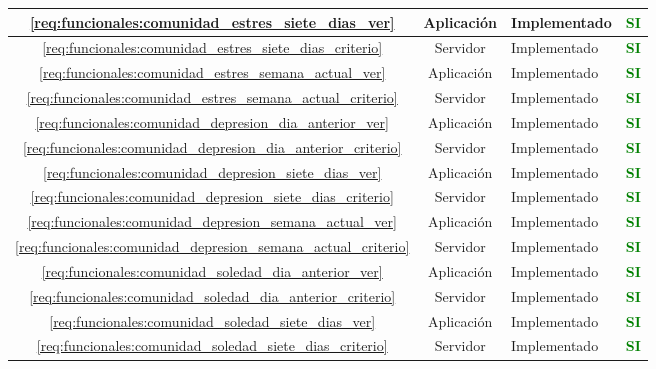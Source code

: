 \begin{xltabular}{\textwidth}{|c|c|X|c|}
        \hline
        \ref{req:funcionales:comunidad_estres_siete_dias_ver} & Aplicación & Implementado & \textcolor{green}{\textbf{SI}} \\
        \hline
        \ref{req:funcionales:comunidad_estres_siete_dias_criterio} & Servidor & Implementado & \textcolor{green}{\textbf{SI}} \\
        \hline
        \ref{req:funcionales:comunidad_estres_semana_actual_ver} & Aplicación & Implementado & \textcolor{green}{\textbf{SI}} \\
        \hline
        \ref{req:funcionales:comunidad_estres_semana_actual_criterio} & Servidor & Implementado & \textcolor{green}{\textbf{SI}} \\
        \hline
        \ref{req:funcionales:comunidad_depresion_dia_anterior_ver} & Aplicación & Implementado & \textcolor{green}{\textbf{SI}} \\
        \hline
        \ref{req:funcionales:comunidad_depresion_dia_anterior_criterio} & Servidor & Implementado & \textcolor{green}{\textbf{SI}} \\
        \hline
        \ref{req:funcionales:comunidad_depresion_siete_dias_ver} & Aplicación & Implementado & \textcolor{green}{\textbf{SI}} \\
        \hline
        \ref{req:funcionales:comunidad_depresion_siete_dias_criterio} & Servidor & Implementado & \textcolor{green}{\textbf{SI}} \\
        \hline
        \ref{req:funcionales:comunidad_depresion_semana_actual_ver} & Aplicación & Implementado & \textcolor{green}{\textbf{SI}} \\
        \hline
        \ref{req:funcionales:comunidad_depresion_semana_actual_criterio} & Servidor & Implementado & \textcolor{green}{\textbf{SI}} \\
        \hline
        \ref{req:funcionales:comunidad_soledad_dia_anterior_ver} & Aplicación & Implementado & \textcolor{green}{\textbf{SI}} \\
        \hline
        \ref{req:funcionales:comunidad_soledad_dia_anterior_criterio} & Servidor & Implementado & \textcolor{green}{\textbf{SI}} \\
        \hline
        \ref{req:funcionales:comunidad_soledad_siete_dias_ver} & Aplicación & Implementado & \textcolor{green}{\textbf{SI}} \\
        \hline
        \ref{req:funcionales:comunidad_soledad_siete_dias_criterio} & Servidor & Implementado & \textcolor{green}{\textbf{SI}} \\
        \hline

\end{xltabular}
